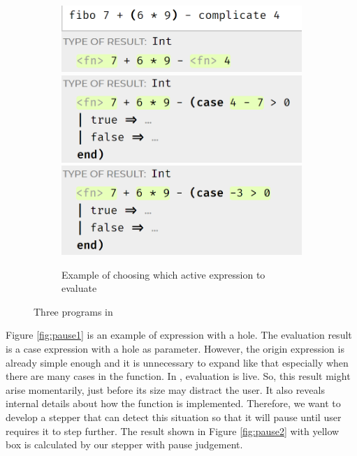 \begin{figure}[htbp]
\begin{subfigure}[b]{0.3\textwidth}
      \includegraphics[width=\textwidth]{img/interactive1.png}
      \includegraphics[width=\textwidth]{img/interactive2.png}
      \includegraphics[width=\textwidth]{img/interactive3.png}
      \caption{Example of choosing which active expression to evaluate}
      \label{fig:multiple}
  \end{subfigure}
    \caption{Three programs in \Hazel}
    \label{fig:intro_example}
\end{figure}


Figure \ref{fig:pause1} is an example of expression with a hole. The evaluation result is a case expression with a hole as parameter. However, the origin expression is already simple enough and it is unnecessary to expand like that especially when there are many cases in the function. In \Hazel, evaluation is live. So, this result might arise momentarily, just before its size may distract the user. It also reveals internal details about how the function is implemented. Therefore, we want to develop a stepper that can detect this situation so that it will pause until user requires it to step further. The result shown in Figure \ref{fig:pause2} with yellow box is calculated by our stepper with pause judgement.

